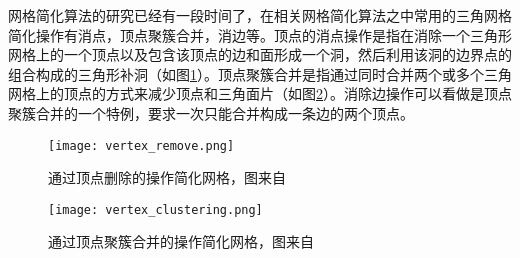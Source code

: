 网格简化算法的研究已经有一段时间了，在相关网格简化算法之中常用的三角网格简化操作有消点，顶点聚簇合并，消边等。顶点的消点操作是指在消除一个三角形网格上的一个顶点以及包含该顶点的边和面形成一个洞，然后利用该洞的边界点的组合构成的三角形补洞（如图\ref{fig:rm-vertex}）。顶点聚簇合并是指通过同时合并两个或多个三角网格上的顶点的方式来减少顶点和三角面片（如图\ref{fig:clu-vertex}）。消除边操作可以看做是顶点聚簇合并的一个特例，要求一次只能合并构成一条边的两个顶点。
\begin{figure}[htbp]
    \centering
    \texttt{[image: vertex\_remove.png]}
    \caption[顶点删除]{通过顶点删除的操作简化网格，图来自\cite{mesh-simp}}
    \label{fig:rm-vertex}
\end{figure}
\begin{figure}[htbp]
    \centering
    \texttt{[image: vertex\_clustering.png]}
    \caption[顶点聚簇合并]{通过顶点聚簇合并的操作简化网格，图来自\cite{mesh-simp}}
    \label{fig:clu-vertex}
\end{figure}

